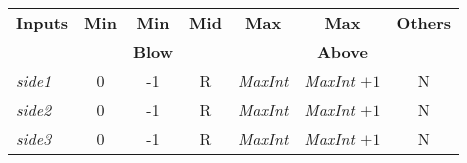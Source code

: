 \begin{center}
  \begin{tabular}{lcccccc}
    \textbf{Inputs} & \textbf{Min} & \textbf{Min} & \textbf{Mid} & \textbf{Max} & \textbf{Max} & \textbf{Others} \\
    && \textbf{Blow} &&& \textbf{Above} &\\
    \textit{side1} & 0 & -1 & R & \textit{MaxInt} & \textit{MaxInt} $+ 1$ & N \\
    \textit{side2} & 0 & -1 & R & \textit{MaxInt} & \textit{MaxInt} $+ 1$ & N \\
    \textit{side3} & 0 & -1 & R & \textit{MaxInt} & \textit{MaxInt} $+ 1$ & N \\
  \end{tabular}
\end{center}
